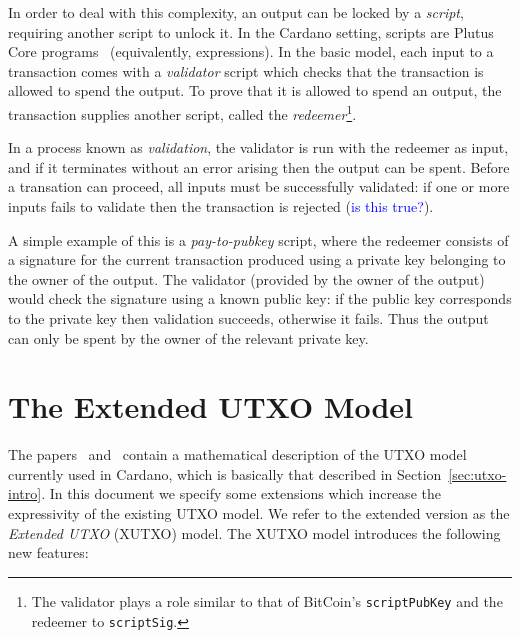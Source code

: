 \documentclass[a4paper]{article}
\newcommand{\blue}[1]{\textcolor{blue}{#1}}
\renewcommand{\i}{\textit}  %
\theoremstyle{definition}  %
\begin{document}
In order to deal with this complexity, an output can be locked by a
\textit{script}, requiring another script to unlock it.  In the
Cardano setting, scripts are Plutus Core
programs~\cite{Plutus-Core-spec} (equivalently, expressions).  In the
basic model, each input to a transaction comes with a \i{validator}
script which checks that the transaction is allowed to spend the
output. To prove that it is allowed to spend an output, the
transaction supplies another script, called the \i{redeemer}\footnote{
  The validator plays a role similar to that of BitCoin's
  \texttt{scriptPubKey} and the redeemer to \texttt{scriptSig}.}.

In a process known as \i{validation}, the validator is run with the
redeemer as input, and if it terminates without an error arising then
the output can be spent.  Before a transation can proceed, all inputs
must be successfully validated: if one or more inputs fails to validate
then the transaction is rejected (\blue{is this true?}).

A simple example of this is a \i{pay-to-pubkey} script, where the
redeemer consists of a signature for the current transaction produced
using a private key belonging to the owner of the output.  The
validator (provided by the owner of the output) would check the
signature using a known public key: if the public key corresponds to
the private key then validation succeeds, otherwise it fails.  Thus
the output can only be spent by the owner of the relevant private key.

\section{The Extended UTXO Model}
\label{sec:xutxo}
The papers~\cite{Zahnentferner18-UTxO}
and~\cite{Zahnentferner18-Chimeric} contain a mathematical description
of the UTXO model currently used in Cardano, which is basically that
described in Section~\ref{sec:utxo-intro}.  In this document we specify
some extensions which increase the expressivity of the existing UTXO
model.  We refer to the extended version as the \textit{Extended UTXO}
(XUTXO) model.  The XUTXO model introduces the following new features:
\end{document}
